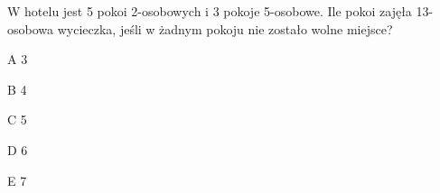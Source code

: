\begin{tresc}
W hotelu jest 5 pokoi 2-osobowych i 3 pokoje 5-osobowe. Ile pokoi zajęła 13-osobowa wycieczka, jeśli w żadnym pokoju nie zostało wolne miejsce?
\end{tresc}
\begin{wariant}{A} 3 \end{wariant}
\begin{wariant}{B} 4 \end{wariant}
\begin{wariant}{C} 5 \end{wariant}
\begin{wariant}{D} 6 \end{wariant}
\begin{wariant}{E} 7 \end{wariant}
